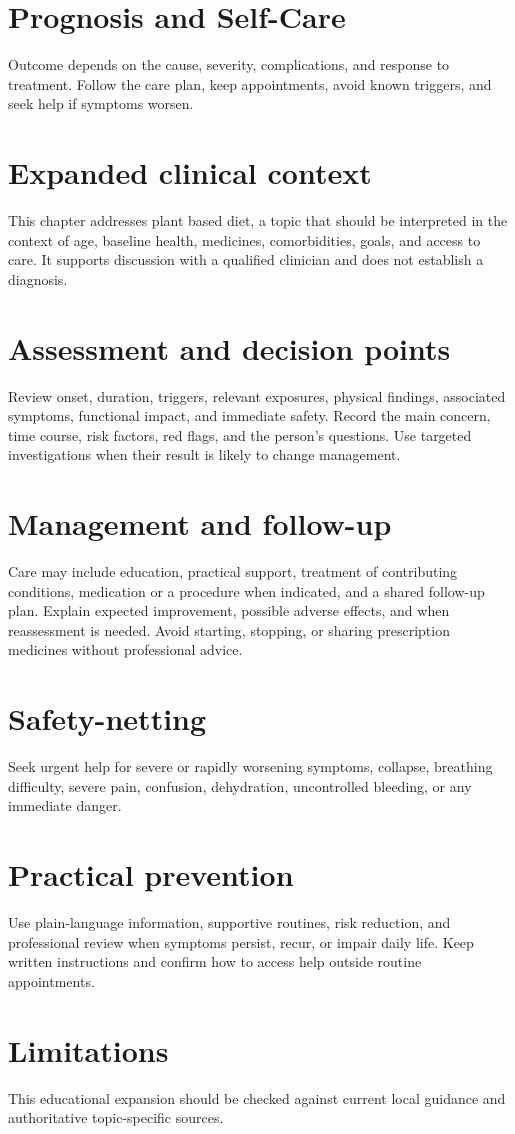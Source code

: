 \section*{Prognosis and Self-Care}
Outcome depends on the cause, severity, complications, and response to treatment. Follow the care plan, keep appointments, avoid known triggers, and seek help if symptoms worsen.

\section*{Expanded clinical context}
This chapter addresses plant based diet, a topic that should be interpreted in the context of age, baseline health, medicines, comorbidities, goals, and access to care. It supports discussion with a qualified clinician and does not establish a diagnosis.

\section*{Assessment and decision points}
Review onset, duration, triggers, relevant exposures, physical findings, associated symptoms, functional impact, and immediate safety. Record the main concern, time course, risk factors, red flags, and the person’s questions. Use targeted investigations when their result is likely to change management.

\section*{Management and follow-up}
Care may include education, practical support, treatment of contributing conditions, medication or a procedure when indicated, and a shared follow-up plan. Explain expected improvement, possible adverse effects, and when reassessment is needed. Avoid starting, stopping, or sharing prescription medicines without professional advice.

\section*{Safety-netting}
Seek urgent help for severe or rapidly worsening symptoms, collapse, breathing difficulty, severe pain, confusion, dehydration, uncontrolled bleeding, or any immediate danger.

\section*{Practical prevention}
Use plain-language information, supportive routines, risk reduction, and professional review when symptoms persist, recur, or impair daily life. Keep written instructions and confirm how to access help outside routine appointments.

\section*{Limitations}
This educational expansion should be checked against current local guidance and authoritative topic-specific sources.
\clearpage
